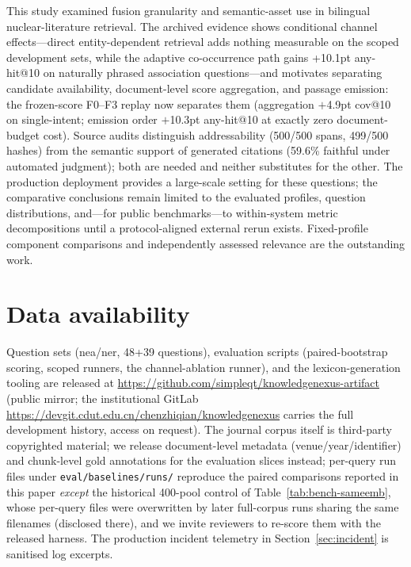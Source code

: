 \documentclass[sigconf,nonacm]{acmart}
\begin{document}
This study examined fusion granularity and semantic-asset use in
bilingual nuclear-literature retrieval. The archived evidence shows
conditional channel effects---direct entity-dependent retrieval adds
nothing measurable on the scoped development sets, while the adaptive
co-occurrence path gains +10.1pt any-hit@10 on naturally phrased
association questions---and motivates separating candidate
availability, document-level score aggregation, and passage emission:
the frozen-score F0--F3 replay now separates them (aggregation
$+$4.9pt cov@10 on single-intent; emission order $+$10.3pt any-hit@10
at exactly zero document-budget cost). Source audits
distinguish addressability (500/500 spans, 499/500 hashes) from the
semantic support of generated citations (59.6\% faithful under
automated judgment); both are needed and neither substitutes for the
other. The production deployment provides a large-scale setting for
these questions; the comparative conclusions remain limited to the
evaluated profiles, question distributions, and---for public
benchmarks---to within-system metric decompositions until a
protocol-aligned external rerun exists. Fixed-profile component
comparisons and independently assessed relevance are the outstanding
work.

\section*{Data availability}

Question sets (nea/ner, 48+39 questions), evaluation scripts
(paired-bootstrap scoring, scoped runners, the channel-ablation runner),
and the lexicon-generation tooling are released at
\url{https://github.com/simpleqt/knowledgenexus-artifact} (public mirror;
the institutional GitLab \url{https://devgit.cdut.edu.cn/chenzhiqian/knowledgenexus}
carries the full development history, access on request). The journal corpus itself is
third-party copyrighted material; we release document-level metadata
(venue/year/identifier) and chunk-level gold annotations for the evaluation
slices instead; per-query run files under \texttt{eval/baselines/runs/}
reproduce the paired comparisons reported in this paper \emph{except}
the historical 400-pool control of Table~\ref{tab:bench-sameemb},
whose per-query files were overwritten by later full-corpus runs
sharing the same filenames (disclosed there), and we invite
reviewers to re-score them with the released harness. The production incident telemetry in
Section~\ref{sec:incident} is sanitised log excerpts.
\end{document}
